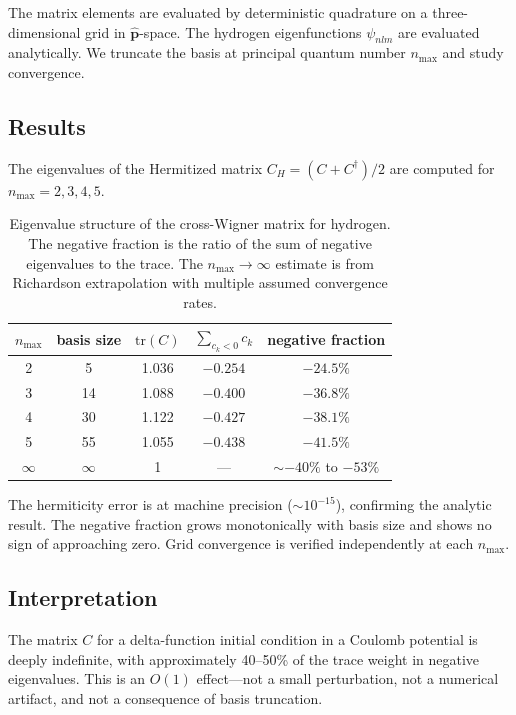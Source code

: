 \documentclass[12pt]{article}
\begin{document}
The matrix elements are evaluated by deterministic quadrature on a three-dimensional grid in $\hat{\mathbf{p}}$-space.  The hydrogen eigenfunctions $\psi_{nlm}$ are evaluated analytically.  We truncate the basis at principal quantum number $n_{\max}$ and study convergence.

\subsection{Results}

The eigenvalues of the Hermitized matrix $C_H = (C + C^\dagger)/2$ are computed for $n_{\max} = 2, 3, 4, 5$.

\begin{table}[h]
\centering
\begin{tabular}{c c c c c}
\hline
$n_{\max}$ & basis size & $\mathrm{tr}(C)$ & $\sum_{c_k<0} c_k$ & negative fraction \\
\hline
2 & 5 & 1.036 & $-0.254$ & $-24.5\%$ \\
3 & 14 & 1.088 & $-0.400$ & $-36.8\%$ \\
4 & 30 & 1.122 & $-0.427$ & $-38.1\%$ \\
5 & 55 & 1.055 & $-0.438$ & $-41.5\%$ \\
\hline
$\infty$ & $\infty$ & 1 & --- & $\sim -40\%$ to $-53\%$ \\
\hline
\end{tabular}
\caption{Eigenvalue structure of the cross-Wigner matrix for hydrogen.  The negative fraction is the ratio of the sum of negative eigenvalues to the trace.  The $n_{\max}\to\infty$ estimate is from Richardson extrapolation with multiple assumed convergence rates.}
\label{tab:eigenvalues}
\end{table}

The hermiticity error is at machine precision ($\sim 10^{-15}$), confirming the analytic result.  The negative fraction grows monotonically with basis size and shows no sign of approaching zero.  Grid convergence is verified independently at each $n_{\max}$.

\subsection{Interpretation}

The matrix $C$ for a delta-function initial condition in a Coulomb potential is deeply indefinite, with approximately 40--50\% of the trace weight in negative eigenvalues.  This is an $O(1)$ effect---not a small perturbation, not a numerical artifact, and not a consequence of basis truncation.
\end{document}
